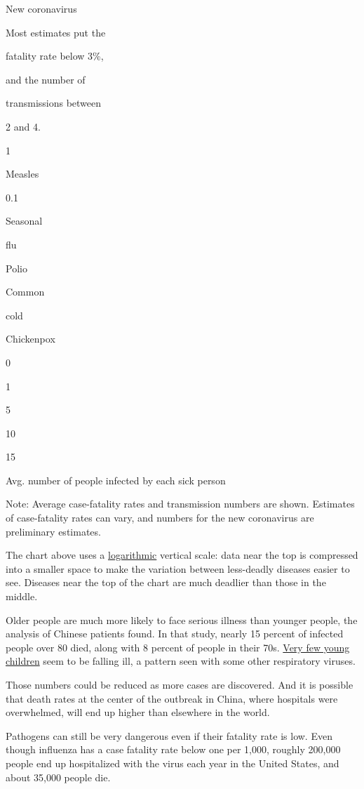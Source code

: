 New coronavirus

Most estimates put the

fatality rate below 3\%,

and the number of

transmissions between

2 and 4.

1

Measles

0.1

Seasonal

flu

Polio

Common

cold

Chickenpox

0

1

5

10

15

Avg. number of people infected by each sick person

Note: Average case-fatality rates and transmission numbers are shown.
Estimates of case-fatality rates can vary, and numbers for the new
coronavirus are preliminary estimates.

The chart above uses a
\href{https://blog.datawrapper.de/weeklychart-logscale/}{logarithmic}
vertical scale: data near the top is compressed into a smaller space to
make the variation between less-deadly diseases easier to see. Diseases
near the top of the chart are much deadlier than those in the middle.

Older people are much more likely to face serious illness than younger
people, the analysis of Chinese patients found. In that study, nearly 15
percent of infected people over 80 died, along with 8 percent of people
in their 70s.
\href{https://www.nytimes3xbfgragh.onion/2020/02/05/health/coronavirus-children.html}{Very
few young children} seem to be falling ill, a pattern seen with some
other respiratory viruses.

Those numbers could be reduced as more cases are discovered. And it is
possible that death rates at the center of the outbreak in China, where
hospitals were overwhelmed, will end up higher than elsewhere in the
world.

Pathogens can still be very dangerous even if their fatality rate is
low. Even though influenza has a case fatality rate below one per 1,000,
roughly 200,000 people end up hospitalized with the virus each year in
the United States, and about 35,000 people die.

